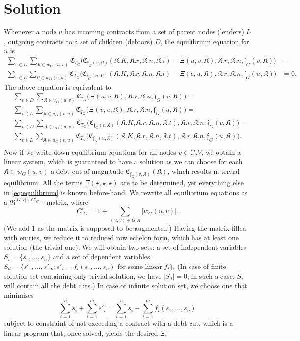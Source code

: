 \documentclass[10pt]{article}
\newcommand{\RR}{\mathfrak{R}}
\newcommand{\KK}{\mathfrak{K}}
\newcommand{\CC}{\mathfrak{C}}
\newcommand{\ff}{\mathfrak{f}}
\begin{document}
\section{Solution}
Whenever a node $u$ has incoming contracts from a set of parent nodes (lenders) $L$, outgoing contracts to a set of children (debtors) $D$, the equilibrium equation for $u$ is
\begin{equation*}
\begin{aligned}
\sum_{v \in D} \sum_{\KK \in w_G(u, v)} \CC_{T_G} \big( \CC_{\ff_G(v, \KK)} ( \KK.K, \KK.r, \KK.n, \KK.t ) - \Xi(u, v, \KK), \KK.r, \KK.n, \ff_G(v, \KK) \big ) & - \\ 
\sum_{v \in L} \sum_{\KK \in w_G(v, u)} \CC_{T_G} \big( \CC_{\ff_G(u, \KK)} ( \KK.K, \KK.r, \KK.n, \KK.t ) - \Xi(v, u, \KK), \KK.r, \KK.n, \ff_G(u, \KK) \big) & = 0.
\end{aligned}
\end{equation*}
The above equation is equivalent to
\begin{equation}
\label{eq:equilibrium}
\begin{aligned}
& \sum_{v \in D} \sum_{\KK \in w_G(u, v)} \CC_{T_G} \big( \Xi(u, v, \KK), \KK.r, \KK.n, \ff_G(v, \KK) \big) - \\
& \sum_{v \in L} \sum_{\KK \in w_G(v, u)} \CC_{T_G} \big( \Xi(v, u, \KK), \KK.r, \KK.n, \ff_G(u, \KK) \big) = \\
& \sum_{ v \in D } \sum_{ \KK \in w_G(u, v) } \CC_{T_G} \big( \CC_{ \ff_G(v, \KK) } (\KK.K, \KK.r, \KK.n, \KK.t), \KK.r, \KK.n, \ff_G( v, \KK ) \big) - \\
& \sum_{ v \in L } \sum_{ \KK \in w_G(v, u) } \CC_{T_G} \big( \CC_{ \ff_G(u, \KK) } (\KK.K, \KK.r, \KK.n, \KK.t), \KK.r, \KK.n, \ff_G( u , \KK) \big). \\
\end{aligned}
\end{equation}
Now if we write down equilibrium equations for all nodes $v \in G.V$, we obtain a linear system, which is guaranteed to have a solution as we can choose for each $\KK \in w_G(u, v)$ a debt cut of magnitude $\CC_{\ff_G(v, \KK)}(\KK)$, which results in trivial equilibrium. All the terms $\Xi(\star, \star, \star)$ are to be determined, yet everything else in \eqref{eq:equilibrium} is known before-hand. We rewrite all equilibrium equations as a $\RR^{|G.V| \times C'_G}$ - matrix, where 
\[
C'_G = 1 + \sum_{(u, v) \in G.A} |w_G(u, v)|.
\]
(We add 1 as the matrix is supposed to be augmented.) Having the matrix filled with entries, we reduce it to reduced row echelon form, which has at least one solution (the trivial one).
We will obtain two sets: a set of independent variables $S_i = \{ s_1, \dots, s_n \}$ and a set of dependent variables $S_d = \{ s'_1, \dots, s'_m \colon s'_i = f_i(s_1, \dots, s_n) \text{ for some linear } f_i \}$. (In case of finite solution set containing only trivial solution, we have $|S_d| = 0$; in such a case, $S_i$ will contain all the debt cuts.) In case of infinite solution set, we choose one that minimizes
\[
\sum_{i = 1}^{n} s_i + \sum_{i = 1}^{m} s'_i = \sum_{i = 1}^{n} s_i + \sum_{i = 1}^{m} f_i(s_1, \dots, s_n) 
\]
subject to constraint of not exceeding a contract with a debt cut, which is a linear program that, once solved, yields the desired $\Xi$.
\end{document}
